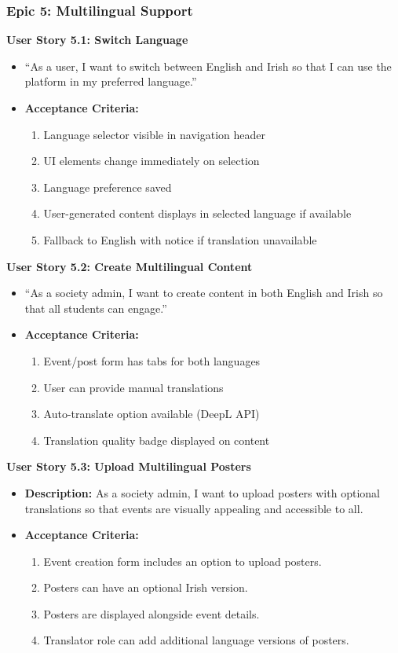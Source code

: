 \documentclass[12pt,a4paper]{article}
\begin{document}
\subsubsection{Epic 5: Multilingual Support}

\textbf{User Story 5.1: Switch Language}
\begin{itemize}
    \item ``As a user, I want to switch between English and Irish so that I can use the platform in my preferred language.''
    \item \textbf{Acceptance Criteria:}
    \begin{enumerate}
        \item Language selector visible in navigation header
        \item UI elements change immediately on selection
        \item Language preference saved
        \item User-generated content displays in selected language if available
        \item Fallback to English with notice if translation unavailable
    \end{enumerate}
\end{itemize}

\textbf{User Story 5.2: Create Multilingual Content}
\begin{itemize}
    \item ``As a society admin, I want to create content in both English and Irish so that all students can engage.''
    \item \textbf{Acceptance Criteria:}
    \begin{enumerate}
        \item Event/post form has tabs for both languages
        \item User can provide manual translations
        \item Auto-translate option available (DeepL API)
        \item Translation quality badge displayed on content
    \end{enumerate}
\end{itemize}

\textbf{User Story 5.3: Upload Multilingual Posters}
\begin{itemize}
    \item \textbf{Description:} As a society admin, I want to upload posters with optional translations so that events are visually appealing and accessible to all.
    \item \textbf{Acceptance Criteria:}
    \begin{enumerate}
        \item Event creation form includes an option to upload posters.
        \item Posters can have an optional Irish version.
        \item Posters are displayed alongside event details.
        \item Translator role can add additional language versions of posters.
    \end{enumerate}
\end{itemize}
\end{document}
